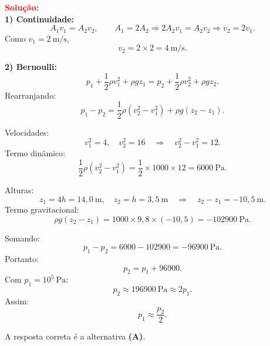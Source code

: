 \begin{flushleft}
\vspace{0.5cm}

\textcolor{red}{\textbf{Solução:}}\\

\textbf{1) Continuidade:}
\[
A_1 v_1 = A_2 v_2,\qquad A_1 = 2A_2 \Rightarrow 2A_2 v_1 = A_2 v_2 \Rightarrow v_2 = 2v_1.
\]
Como \(v_1 = 2\ \mathrm{m/s}\),
\[
v_2 = 2\times 2 = 4\ \mathrm{m/s}.
\]

\textbf{2) Bernoulli:}
\[
p_1 + \frac{1}{2}\rho v_1^2 + \rho g z_1
= p_2 + \frac{1}{2}\rho v_2^2 + \rho g z_2.
\]
Rearranjando:
\[
p_1 - p_2 = \frac{1}{2}\rho\left(v_2^2 - v_1^2\right) + \rho g (z_2 - z_1).
\]

Velocidades:
\[
v_1^2 = 4,\quad v_2^2 = 16 \quad\Rightarrow\quad v_2^2 - v_1^2 = 12.
\]
Termo dinâmico:
\[
\frac{1}{2}\rho (v_2^2 - v_1^2) = \frac{1}{2}\times 1000 \times 12 = 6000\ \mathrm{Pa}.
\]

Alturas:
\[
z_1 = 4h = 14{,}0\ \mathrm{m},\quad z_2 = h = 3{,}5\ \mathrm{m} \quad\Rightarrow\quad z_2 - z_1 = -10{,}5\ \mathrm{m}.
\]
Termo gravitacional:
\[
\rho g (z_2 - z_1) = 1000 \times 9{,}8 \times (-10{,}5) = -102900\ \mathrm{Pa}.
\]

Somando:
\[
p_1 - p_2 = 6000 - 102900 = -96900\ \mathrm{Pa}.
\]
Portanto:
\[
p_2 = p_1 + 96900.
\]
Com \(p_1=10^5\ \mathrm{Pa}\):
\[
p_2 \approx 196900\ \mathrm{Pa} \approx 2p_1.
\]
Assim:
\[
p_1 \approx \frac{p_2}{2}.
\]

A resposta correta é a alternativa \colorbox{green!50}{\textbf{(A)}}.

\end{flushleft}

